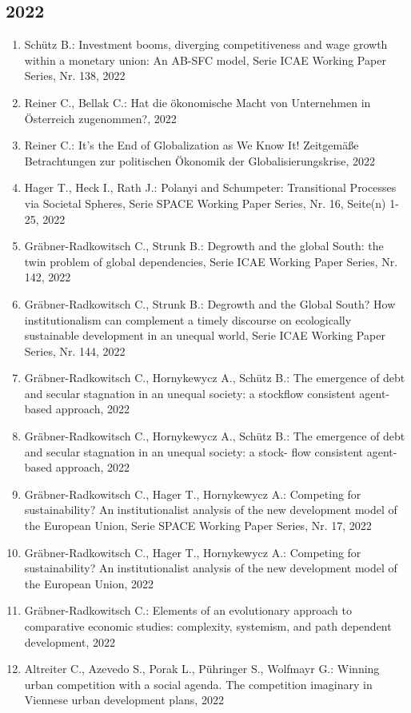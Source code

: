\subsection*{2022}
\begin{enumerate}
    	 \item Schütz B.: Investment booms, diverging competitiveness and wage growth within a monetary union: An AB-SFC model, Serie ICAE Working Paper Series, Nr. 138, 2022
	 \item Reiner C., Bellak C.: Hat die ökonomische Macht von Unternehmen in Österreich zugenommen?, 2022
	 \item Reiner C.: It’s the End of Globalization as We Know It! Zeitgemäße Betrachtungen zur politischen Ökonomik der Globalisierungskrise, 2022
	 \item Hager T., Heck I., Rath J.: Polanyi and Schumpeter: Transitional Processes via Societal Spheres, Serie SPACE Working Paper Series, Nr. 16, Seite(n) 1-25, 2022
	 \item Gräbner-Radkowitsch C., Strunk B.: Degrowth and the global South: the twin problem of global dependencies, Serie ICAE Working Paper Series, Nr. 142, 2022
	 \item Gräbner-Radkowitsch C., Strunk B.: Degrowth and the Global South? How institutionalism can complement a timely discourse on ecologically sustainable development in an unequal world, Serie ICAE Working Paper Series, Nr. 144, 2022
	 \item Gräbner-Radkowitsch C., Hornykewycz A., Schütz B.: The emergence of debt and secular stagnation in an unequal society: a stockflow consistent agent-based approach, 2022
	 \item Gräbner-Radkowitsch C., Hornykewycz A., Schütz B.: The emergence of debt and secular stagnation in an unequal society: a stock- flow consistent agent-based approach, 2022
	 \item Gräbner-Radkowitsch C., Hager T., Hornykewycz A.: Competing for sustainability? An institutionalist analysis of the new development model of the European Union, Serie SPACE Working Paper Series, Nr. 17, 2022
	 \item Gräbner-Radkowitsch C., Hager T., Hornykewycz A.: Competing for sustainability? An institutionalist analysis of the new development model of the European Union, 2022
	 \item Gräbner-Radkowitsch C.: Elements of an evolutionary approach to comparative economic studies: complexity, systemism, and path dependent development, 2022
	 \item Altreiter C., Azevedo S., Porak L., Pühringer S., Wolfmayr G.: Winning urban competition with a social agenda. The competition imaginary in Viennese urban development plans, 2022

\end{enumerate}
